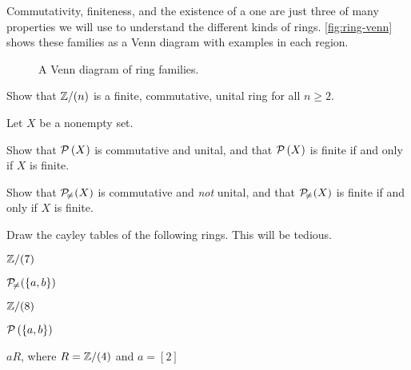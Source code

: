 Commutativity, finiteness, and the existence of a one are just three of many properties we will use to understand the different kinds of rings.
\autoref{fig:ring-venn} shows these families as a Venn diagram with examples in each region.
\begin{figure}[h]
\begin{center}
\caption{\label{fig:ring-venn} A Venn diagram of ring families.}
\end{center}
\end{figure}



\Exercises%

\begin{exercise}
Show that \(\mathbb{Z}/(n)\) is a finite, commutative, unital ring for all \(n \geq 2\).
\end{exercise}


\begin{exercise}
Let \(X\) be a nonempty set.
\begin{proplist*}
\item Show that \(\mathcal{P}\left(X\right)\) is commutative and unital, and that \(\mathcal{P}\left(X\right)\) is finite if and only if \(X\) is finite.
\item Show that \(\mathcal{P}_{\!\neq\!}\left(X\right)\) is commutative and \emph{not} unital, and that \(\mathcal{P}_{\!\neq\!}\left(X\right)\) is finite if and only if \(X\) is finite.
\end{proplist*}
\end{exercise}


\begin{exercise}
Draw the cayley tables of the following rings.
This will be tedious.
\begin{proplist*}
\item \(\mathbb{Z}/(7)\)
\item \(\mathcal{P}_{\!\neq\!}\left(\{a,b\}\right)\)
\item \(\mathbb{Z}/(8)\)
\item \(\mathcal{P}\left(\{a,b\}\right)\)
\item \(aR\), where \(R = \mathbb{Z}/(4)\) and \(a = [2]\)
\end{proplist*}
\end{exercise}


